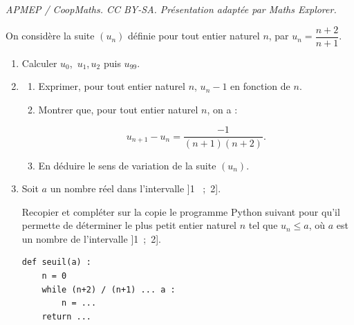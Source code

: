\documentclass[10pt]{article}
\begin{document}
\noindent\textit{APMEP / CoopMaths. CC BY-SA. Présentation adaptée par Maths Explorer.}\par\medskip
\medskip

On considère la suite $\left(u_n\right)$ définie pour tout entier naturel $n$, par $u_n = \dfrac{n+2}{n+1}$.

\medskip

\begin{enumerate}
\item Calculer $u_0$,\, $u_1$,\,$u_2$ puis $u_{99}$.
\item 
	\begin{enumerate}
		\item Exprimer, pour tout entier naturel $n$, $u_n - 1$ en fonction de $n$.
		\item Montrer que, pour tout entier naturel $n$, on a :
		
\[u_{n+1} - u_n = \dfrac{- 1}{(n+1)(n+2)}.\]

		\item En déduire le sens de variation de la suite $\left(u_n\right)$.
	\end{enumerate}
\item Soit $a$ un nombre réel dans l'intervalle ]1 ~;~2].

Recopier et compléter sur la copie le programme Python suivant pour qu'il permette de déterminer le plus petit entier naturel $n$ tel que $u_n \leqslant a$, où $a$ est un nombre de l'intervalle ]1~;~2].

\begin{center}
\begin{lstlisting}[style=python]
def seuil(a) :
	n = 0
	while (n+2) / (n+1) ... a : 
		n = ...
	return ... 
\end{lstlisting}
\end{center}
\end{enumerate}
\end{document}
